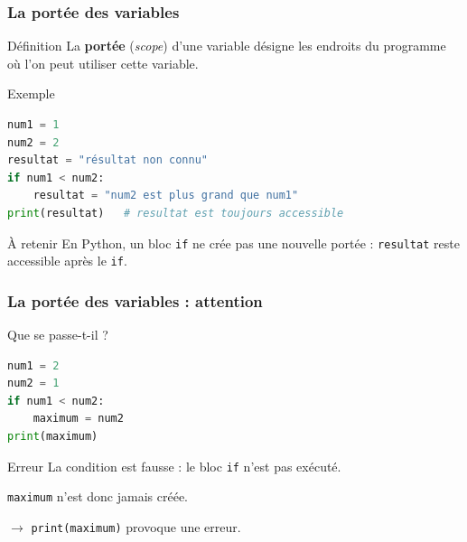 \documentclass[10pt]{beamer}
\begin{document}
\begin{frame}[containsverbatim]
	\frametitle{La portée des variables}
	
	
	\begin{block}{Définition}
		La \textbf{portée} (\textit{scope}) d'une variable désigne
		les endroits du programme où l'on peut utiliser cette variable.
	\end{block}
	
	\vspace{0.15cm}
	
	\begin{exampleblock}{Exemple}
\begin{lstlisting}[language=Python]
num1 = 1
num2 = 2
resultat = "résultat non connu"
if num1 < num2:
	resultat = "num2 est plus grand que num1"
print(resultat)   # resultat est toujours accessible
\end{lstlisting}
	\end{exampleblock}
	
	
	\vspace{0.1cm}
	
	\begin{alertblock}{À retenir}
		En Python, un bloc \texttt{if} ne crée pas une nouvelle portée :
		\texttt{resultat} reste accessible après le \texttt{if}.
	\end{alertblock}

	
\end{frame}

\begin{frame}[containsverbatim]
	\frametitle{La portée des variables : attention}
	
	
\begin{exampleblock}{Que se passe-t-il ?}
\begin{lstlisting}[language=Python]
num1 = 2
num2 = 1
if num1 < num2:
	maximum = num2
print(maximum)
\end{lstlisting}
\end{exampleblock}
	
	
	\vspace{0.15cm}
	
	\begin{alertblock}{Erreur}
		La condition est fausse : le bloc \texttt{if} n'est pas exécuté.
		
		\texttt{maximum} n'est donc jamais créée.
		
		$\rightarrow$ \texttt{print(maximum)} provoque une erreur.
	\end{alertblock}
	
	
\end{frame}
\end{document}
